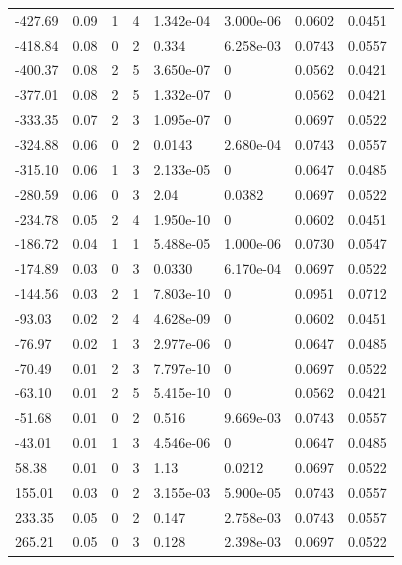 \documentclass[preview]{standalone}
\begin{document}
{{\begin{tabular}{L{1.2cm}C{1.2cm} C{0.3cm}C{0.5cm} C{1.4cm}C{1.4cm} C{1.4cm}C{1.4cm}}
  -427.69  &  0.09  & 1     &  4 &  1.342e-04  & 3.000e-06  & 0.0602 &  0.0451   \\ 
  -418.84  &  0.08  & 0     &  2 &  0.334  & 6.258e-03  & 0.0743 &  0.0557   \\ 
  -400.37  &  0.08  & 2     &  5 &  3.650e-07  & 0  & 0.0562 &  0.0421   \\ 
  -377.01  &  0.08  & 2     &  5 &  1.332e-07  & 0  & 0.0562 &  0.0421   \\ 
  -333.35  &  0.07  & 2     &  3 &  1.095e-07  & 0  & 0.0697 &  0.0522   \\ 
  -324.88  &  0.06  & 0     &  2 &  0.0143  & 2.680e-04  & 0.0743 &  0.0557   \\ 
  -315.10  &  0.06  & 1     &  3 &  2.133e-05  & 0  & 0.0647 &  0.0485   \\ 
  -280.59  &  0.06  & 0     &  3 &  2.04  & 0.0382  & 0.0697 &  0.0522   \\ 
  -234.78  &  0.05  & 2     &  4 &  1.950e-10  & 0  & 0.0602 &  0.0451   \\ 
  -186.72  &  0.04  & 1     &  1 &  5.488e-05  & 1.000e-06  & 0.0730 &  0.0547   \\ 
  -174.89  &  0.03  & 0     &  3 &  0.0330  & 6.170e-04  & 0.0697 &  0.0522   \\ 
  -144.56  &  0.03  & 2     &  1 &  7.803e-10  & 0  & 0.0951 &  0.0712   \\ 
  -93.03  &  0.02  & 2     &  4 &  4.628e-09  & 0  & 0.0602 &  0.0451   \\ 
  -76.97  &  0.02  & 1     &  3 &  2.977e-06  & 0  & 0.0647 &  0.0485   \\ 
  -70.49  &  0.01  & 2     &  3 &  7.797e-10  & 0  & 0.0697 &  0.0522   \\ 
  -63.10  &  0.01  & 2     &  5 &  5.415e-10  & 0  & 0.0562 &  0.0421   \\ 
  -51.68  &  0.01  & 0     &  2 &  0.516  & 9.669e-03  & 0.0743 &  0.0557   \\ 
  -43.01  &  0.01  & 1     &  3 &  4.546e-06  & 0  & 0.0647 &  0.0485   \\ 
  58.38  &  0.01  & 0     &  3 &  1.13  & 0.0212  & 0.0697 &  0.0522   \\ 
  155.01  &  0.03  & 0     &  2 &  3.155e-03  & 5.900e-05  & 0.0743 &  0.0557   \\ 
  233.35  &  0.05  & 0     &  2 &  0.147  & 2.758e-03  & 0.0743 &  0.0557   \\ 
  265.21  &  0.05  & 0     &  3 &  0.128  & 2.398e-03  & 0.0697 &  0.0522   \\ 

\end{tabular}}}
\end{document}
